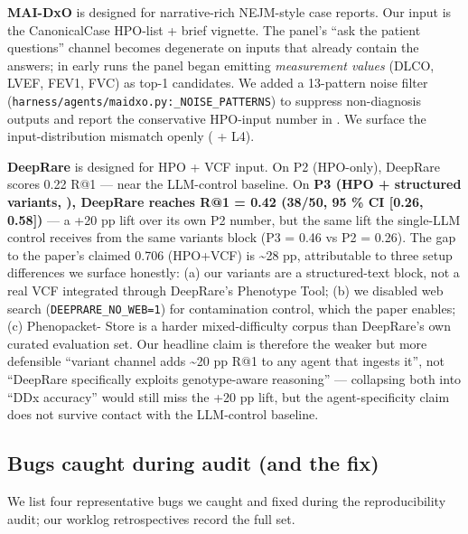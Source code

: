 \textbf{MAI-DxO} is designed for narrative-rich NEJM-style case reports. Our
input is the CanonicalCase HPO-list + brief vignette. The panel's ``ask
the patient questions'' channel becomes degenerate on inputs that
already contain the answers; in early runs the panel began emitting
\emph{measurement values} (DLCO, LVEF, FEV1, FVC) as top-1 candidates. We
added a 13-pattern noise filter (\texttt{harness/agents/maidxo.py:\_NOISE\_PATTERNS})
to suppress non-diagnosis outputs and report the conservative
HPO-input number in . We surface the input-distribution
mismatch openly ( +  L4).

\textbf{DeepRare} is designed for HPO + VCF input. On P2 (HPO-only),
DeepRare scores 0.22 R@1 --- near the LLM-control baseline. On
\textbf{P3 (HPO + structured variants, ), DeepRare reaches R@1 = 0.42 (38/50, 95 \% CI {[}0.26, 0.58{]})} --- a +20 pp lift over its
own P2 number, but the same lift the single-LLM control receives from the same variants block (P3 = 0.46 vs P2 = 0.26). The gap
to the paper's claimed 0.706 (HPO+VCF) is \textasciitilde28 pp, attributable to
three setup differences we surface honestly: (a) our variants are a
structured-text block, not a real VCF integrated through DeepRare's
Phenotype Tool; (b) we disabled web search (\texttt{DEEPRARE\_NO\_WEB=1})
for contamination control, which the paper enables; (c) Phenopacket-
Store is a harder mixed-difficulty corpus than DeepRare's own
curated evaluation set. Our headline claim is therefore the weaker but more defensible ``variant channel adds \textasciitilde20 pp R@1 to any agent that ingests it'', not ``DeepRare specifically exploits
genotype-aware reasoning'' --- collapsing both into ``DDx accuracy''
would still miss the +20 pp lift, but the agent-specificity claim
does not survive contact with the LLM-control baseline.

\subsection{Bugs caught during audit (and the fix)}\label{bugs-caught-during-audit-and-the-fix}

We list four representative bugs we caught and fixed during the
reproducibility audit; our worklog retrospectives record the full set.

